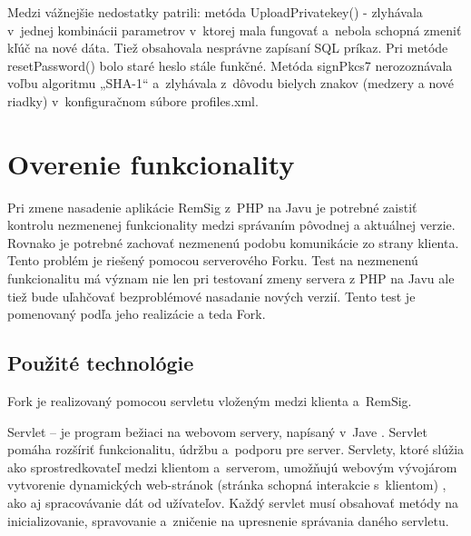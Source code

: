 \documentclass[
  digital, %
  table,   %
oneside,
  nolof,     %
  nolot,     %
]{fithesis3}
\begin{document}
Medzi vážnejšie nedostatky patrili: metóda UploadPrivatekey() - zlyhávala v~jednej kombinácii parametrov v~ktorej mala fungovať a~nebola schopná zmeniť kľúč na nové dáta. Tiež obsahovala nesprávne zapísaní SQL príkaz. Pri metóde resetPassword() bolo staré heslo stále funkčné. Metóda signPkcs7 nerozoznávala voľbu algoritmu „SHA-1“ a~zlyhávala z~dôvodu bielych znakov (medzery a nové riadky) v~konfiguračnom súbore profiles.xml. 



\section{Overenie funkcionality}
Pri zmene nasadenie aplikácie RemSig z~PHP na Javu je potrebné zaistiť kontrolu nezmenenej funkcionality medzi správaním pôvodnej a aktuálnej verzie. Rovnako je potrebné zachovať nezmenenú podobu komunikácie zo strany klienta. Tento problém je riešený pomocou serverového Forku. Test na nezmenenú funkcionalitu má význam nie len pri testovaní zmeny servera z PHP na Javu ale tiež bude uľahčovať bezproblémové nasadanie nových verzií. Tento test je pomenovaný podľa jeho realizácie a teda Fork. 
\subsection{Použité technológie}
Fork je realizovaný pomocou servletu vloženým medzi klienta a~RemSig.

Servlet – je program bežiaci na webovom servery, napísaný v~Jave \cite{servlet}. Servlet pomáha rozšíriť  funkcionalitu, údržbu a~podporu pre server. Servlety, ktoré slúžia ako sprostredkovateľ medzi klientom a~serverom,  umožňujú webovým vývojárom vytvorenie dynamických web-stránok (stránka schopná interakcie s~klientom) \cite{staticVsDynamic}, ako aj spracovávanie dát od užívateľov. Každý servlet musí obsahovať metódy na inicializovanie, spravovanie a~zničenie na upresnenie správania daného servletu.
\end{document}
